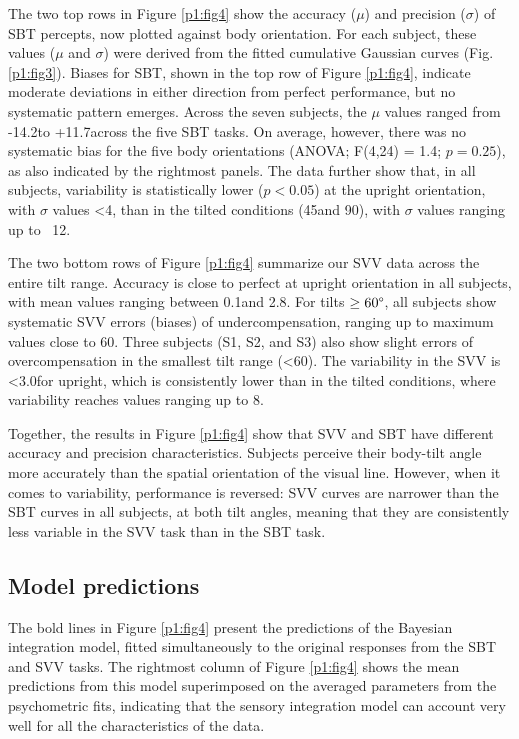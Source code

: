 The two top rows in Figure \ref{p1:fig4} show the accuracy ($\mu$) and precision ($\sigma$) of SBT percepts, now plotted against body orientation. For each subject, these values ($\mu$ and $\sigma$) were derived from the fitted cumulative Gaussian curves (Fig. \ref{p1:fig3}). Biases for SBT, shown in the top row of Figure \ref{p1:fig4}, indicate moderate deviations in either direction from perfect performance, but no systematic pattern emerges. Across the seven subjects, the $\mu$ values ranged from -14.2\mydegree to +11.7\mydegree across the five SBT tasks. On average, however, there was no systematic bias for the five body orientations (ANOVA; F(4,24) = 1.4; $p = 0.25$), as also indicated by the rightmost panels. The data further show that, in all subjects, variability is statistically lower ($p < 0.05$) at the upright orientation, with $\sigma$ values \textless4\textdegree, than in the tilted conditions (45\mydegree and 90\textdegree), with $\sigma$ values ranging up to ~12\textdegree. 

The two bottom rows of Figure \ref{p1:fig4} summarize our SVV data across the entire tilt range. Accuracy is close to perfect at upright orientation in all subjects, with mean values ranging between 0.1\mydegree and 2.8\textdegree. For tilts $\ge60\degree$, all subjects show systematic SVV errors (biases) of undercompensation, ranging up to maximum values close to 60\textdegree. Three subjects (S1, S2, and S3) also show slight errors of overcompensation in the smallest tilt range (\textless60\textdegree). The variability in the SVV is \textless3.0\mydegree for upright, which is consistently lower than in the tilted conditions, where variability reaches values ranging up to 8\textdegree. 

Together, the results in Figure \ref{p1:fig4} show that SVV and SBT have different accuracy and precision characteristics. Subjects perceive their body-tilt angle more accurately than the spatial orientation of the visual line. However, when it comes to variability, performance is reversed: SVV curves are narrower than the SBT curves in all subjects, at both tilt angles, meaning that they are consistently less variable in the SVV task than in the SBT task. 

\subsection{Model predictions}

The bold lines in Figure \ref{p1:fig4} present the predictions of the Bayesian integration model, fitted simultaneously to the original responses from the SBT and SVV tasks. The rightmost column of Figure \ref{p1:fig4} shows the mean predictions from this model superimposed on the averaged parameters from the psychometric fits, indicating that the sensory integration model can account very well for all the characteristics of the data. 

